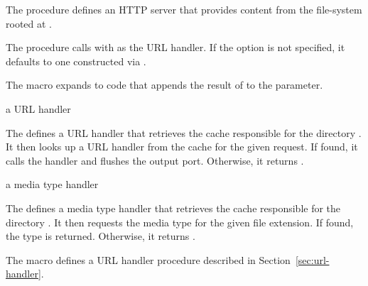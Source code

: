 The  procedure defines an HTTP server
that provides content from the file-system rooted at .

The  procedure calls
 with
 as the URL
handler. If the  option is not specified, it
defaults to one constructed via
.

\begin{syntax}
\end{syntax}

The  macro expands to code that appends the
result of  to the
 parameter.

\begin{procedure}
\end{procedure}
\returns{} a URL handler

The  defines a URL handler
that retrieves the cache responsible for the directory . It
then looks up a URL handler from the cache for the given request. If
found, it calls the handler and flushes the output port. Otherwise, it
returns .

\begin{procedure}
\end{procedure}
\returns{} a media type handler

The  defines a media type
handler that retrieves the cache responsible for the directory
. It then requests the media type for the given file
extension. If found, the type is returned. Otherwise, it returns
.

\begin{syntax}
\end{syntax}

The  macro defines a URL handler procedure
described in Section~\ref{sec:url-handler}.

